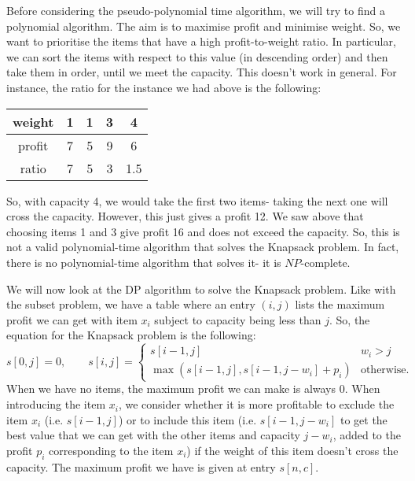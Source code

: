\documentclass[a4paper, openany]{memoir}
\begin{document}
    Before considering the pseudo-polynomial time algorithm, we will try to find a polynomial algorithm. The aim is to maximise profit and minimise weight. So, we want to prioritise the items that have a high profit-to-weight ratio. In particular, we can sort the items with respect to this value (in descending order) and then take them in order, until we meet the capacity. This doesn't work in general. For instance, the ratio for the instance we had above is the following:
    \begin{table}[H]
        \centering
        \begin{tabular}{c|cccc}
            weight & 1 & 1 & 3 & 4 \\
            \hline
            profit & 7 & 5 & 9 & 6  \\
            \hline
            ratio & 7 & 5 & 3 & 1.5
        \end{tabular}
    \end{table}
    \noindent So, with capacity 4, we would take the first two items- taking the next one will cross the capacity. However, this just gives a profit 12. We saw above that choosing items 1 and 3 give profit 16 and does not exceed the capacity. So, this is not a valid polynomial-time algorithm that solves the Knapsack problem. In fact, there is no polynomial-time algorithm that solves it- it is $NP$-complete.

    We will now look at the DP algorithm to solve the Knapsack problem. Like with the subset problem, we have a table where an entry $(i, j)$ lists the maximum profit we can get with item $x_i$ subject to capacity being less than $j$. So, the equation for the Knapsack problem is the following:
    \[s[0, j] = 0, \qquad s[i, j] = \begin{cases}
        s[i-1, j] & w_i > j \\
        \max(s[i-1, j], s[i-1, j-w_i] + p_i) & \text{otherwise}.
    \end{cases}\]
    When we have no items, the maximum profit we can make is always $0$. When introducing the item $x_i$, we consider whether it is more profitable to exclude the item $x_i$ (i.e. $s[i-1, j]$) or to include this item (i.e. $s[i-1, j-w_i]$ to get the best value that we can get with the other items and capacity $j-w_i$, added to the profit $p_i$ corresponding to the item $x_i$) if the weight of this item doesn't cross the capacity. The maximum profit we have is given at entry $s[n, c]$. 
    
\end{document}
